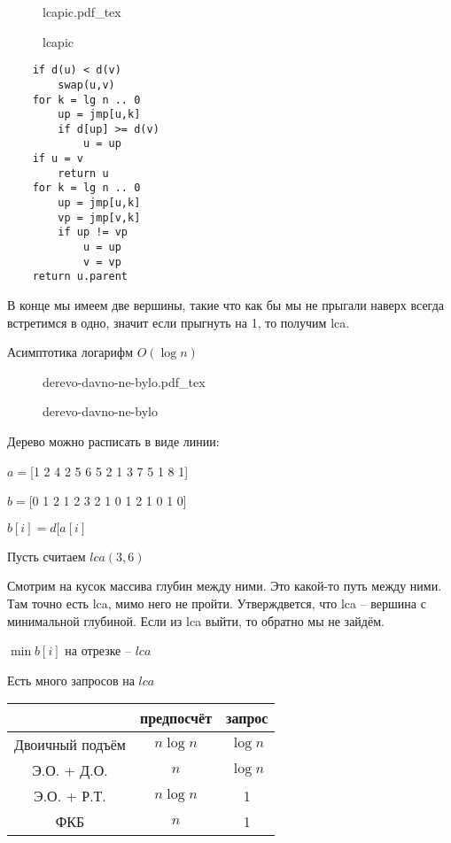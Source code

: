 \documentclass{book}
\theoremstyle{definition}
\newcommand{\incfig}[1]{%
    \def\svgwidth{\columnwidth}
    {#1.pdf_tex}
}
\begin{document}
\begin{figure}[!ht]
    \centering
    \incfig{lcapic}
    \caption{lcapic}
    \label{fig:lcapic}
\end{figure}

\begin{lstlisting}
    if d(u) < d(v)
        swap(u,v)
    for k = lg n .. 0
        up = jmp[u,k]
        if d[up] >= d(v)
            u = up
    if u = v
        return u
    for k = lg n .. 0
        up = jmp[u,k]
        vp = jmp[v,k]
        if up != vp
            u = up
            v = vp
    return u.parent
\end{lstlisting}

В конце мы имеем две вершины, такие что как бы мы не прыгали наверх всегда встретимся в одно, значит если прыгнуть на 1, то получим lca.

Асимптотика логарифм $O(\log n)$

\begin{figure}[!ht]
    \centering
    \incfig{derevo-davno-ne-bylo}
    \caption{derevo-davno-ne-bylo}
    \label{fig:derevo-davno-ne-bylo}
\end{figure}

Дерево можно расписать в виде линии:

$a = $[1 2 4 2 5 6 5 2 1 3 7 5 1 8 1]

$b = $[0 1 2 1 2 3 2 1 0 1 2 1 0 1 0]

$b[i] = d[a[i]$ 

Пусть считаем $lca(3,6)$

Смотрим на кусок массива глубин между ними. Это какой-то путь между ними. Там точно есть lca, мимо него не пройти. Утверждвется, что lca -- вершина с минимальной глубиной. Если из lca выйти, то обратно мы не зайдём.

$\min b[i]$ на отрезке --  $lca$

\begin{problem}
    Есть много запросов на $lca$

\end{problem}

    \begin{tabular}{c|c|c}
        &предпосчёт & запрос\\\hline
        Двоичный подъём & $n\log n$ & $\log n$\\
        Э.О. + Д.О. & $n$ &  $\log n$\\
        Э.О. + Р.Т. & $n\log n$ & 1\\
        ФКБ & $n$ & 1\\
    \end{tabular}
\end{document}
